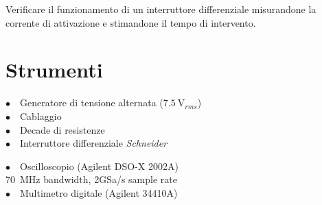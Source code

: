 Verificare il funzionamento di un interruttore differenziale misurandone la corrente di attivazione e stimandone il tempo di intervento.

\section{Strumenti}
%
\phantom{porcodio!}
\noindent
\begin{minipage}{.5\linewidth}
$\bullet \quad$Generatore di tensione alternata ($\SI{7.5}{\volt}_{rms}$)\\
$\bullet \quad$Cablaggio\\
$\bullet \quad$Decade di resistenze\\
$\bullet \quad$Interruttore differenziale \emph{Schneider}
\end{minipage}%
\begin{minipage}{.5\linewidth}
$\bullet \quad$Oscilloscopio (Agilent DSO-X 2002A)\\
\phantom{xxxx}\SI{70}{\mega\hertz} bandwidth, 2GSa/s sample rate\\
$\bullet \quad$Multimetro digitale (Agilent 34410A)\\
\end{minipage}